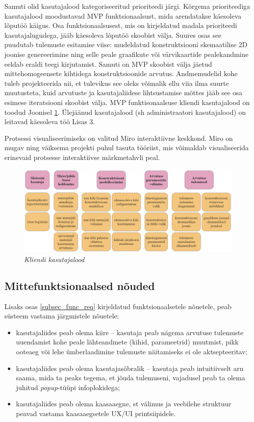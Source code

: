 Samuti olid kasutajalood kategoriseeritud prioriteedi järgi. Kõrgema prioriteediga kasutajalood moodustavad MVP funktsionaalsust, mida arendatakse käesoleva lõputöö käigus.
Osa funktsionaalsusest, mis on kirjeldatud madala prioriteedi kasutajalugudega, jääb käesoleva lõputöö skoobist välja. Suures osas see puudutab tulemuste esitamise
viise: mudeldatud konstruktsiooni skemaatilise 2D joonise genereerimine ning selle peale graafikute või värvikaartide pealekandmine eeldab 
eraldi teegi kirjutamist. Samuti on MVP skoobist välja jäetud mittehomogeensete kihtidega konstruktsioonide arvutus. Andmemudelid kohe tuleb projekteerida nii, et tulevikus
see oleks võimalik ellu viia ilma suurte muutusteta, kuid arvutuste ja kasutajaliidese lihtsustamise mõttes jääb see osa esimese iteratsiooni skoobist välja. MVP funktisonaalsuse 
kliendi kasutajalood on toodud Joonisel \ref{fig:client_userstories}. Ülejäänud kasutajalood (sh administraatori kasutajalood) on leitavad käesoleva töö Lisas 3. 

Protsessi visualiseerimiseks on valitud Miro interaktiivne keskkond. Miro on mugav ning väiksema projekti puhul tasuta tööriist, mis võimaldab visualiseerida erinevaid protsesse
interaktiivse märkmetahvli peal.

\begin{figure}[ht]
    \centering
    \includegraphics[width=1\textwidth]{figures/analysis/client_userstories0.png}
    \caption[Funktsionaalsed nõuded, kliendi kasutajalood]{\textit{Kliendi kasutajalood}}
    \label{fig:client_userstories}
\end{figure}


\subsection{Mittefunktsionaalsed nõuded}
Lisaks osas \ref{subsec_func_req} kirjeldatud funktsionaalsetele nõuetele, peab süsteem vastama järgmistele nõuetele:
\begin{itemize}
    \item kasutajaliides peab olema kiire -- kasutaja peab nägema arvutuse tulemuste uuendamist kohe peale 
lähteandmete (kihid, parameetrid) muutmist, pikk ooteaeg või lehe ümberlaadimine tulemuste näitamiseks ei ole aktsepteeritav;
    \item kasutajaliides peab olema kasutajasõbralik -- kasutaja peab intuitiivselt aru saama, mida ta peaks tegema, et 
jõuda tulemuseni, vajadusel peab ta olema juhitud \textit{popup}-tüüpi infoplokidega;
    \item kasutajaliides peab olema kaasaaegne, st välimus ja veebilehe struktuur peavad
vastama kaasaaegsetele UX/UI printsiipidele.
\end{itemize}

